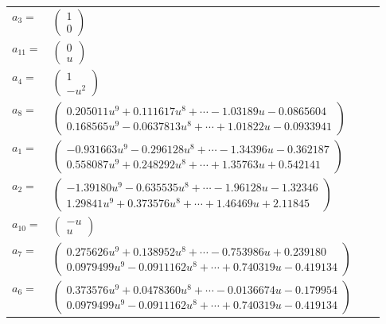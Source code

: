 \documentclass[1p]{elsarticle_modified}
\theoremstyle{definition}
\begin{document}
\begin{tabular}{m{7pt} m{180pt} m{7pt} m{180pt} }
\flushright $a_{3}=$&$\begin{pmatrix}1\\0\end{pmatrix}$ \\
\flushright $a_{11}=$&$\begin{pmatrix}0\\u\end{pmatrix}$ \\
\flushright $a_{4}=$&$\begin{pmatrix}1\\- u^2\end{pmatrix}$ \\
\flushright $a_{8}=$&$\begin{pmatrix}0.205011 u^{9}+0.111617 u^{8}+\cdots-1.03189 u-0.0865604\\0.168565 u^{9}-0.0637813 u^{8}+\cdots+1.01822 u-0.0933941\end{pmatrix}$ \\
\flushright $a_{1}=$&$\begin{pmatrix}-0.931663 u^{9}-0.296128 u^{8}+\cdots-1.34396 u-0.362187\\0.558087 u^{9}+0.248292 u^{8}+\cdots+1.35763 u+0.542141\end{pmatrix}$ \\
\flushright $a_{2}=$&$\begin{pmatrix}-1.39180 u^{9}-0.635535 u^{8}+\cdots-1.96128 u-1.32346\\1.29841 u^{9}+0.373576 u^{8}+\cdots+1.46469 u+2.11845\end{pmatrix}$ \\
\flushright $a_{10}=$&$\begin{pmatrix}- u\\u\end{pmatrix}$ \\
\flushright $a_{7}=$&$\begin{pmatrix}0.275626 u^{9}+0.138952 u^{8}+\cdots-0.753986 u+0.239180\\0.0979499 u^{9}-0.0911162 u^{8}+\cdots+0.740319 u-0.419134\end{pmatrix}$ \\
\flushright $a_{6}=$&$\begin{pmatrix}0.373576 u^{9}+0.0478360 u^{8}+\cdots-0.0136674 u-0.179954\\0.0979499 u^{9}-0.0911162 u^{8}+\cdots+0.740319 u-0.419134\end{pmatrix}$ \\

\end{tabular}
\end{document}
